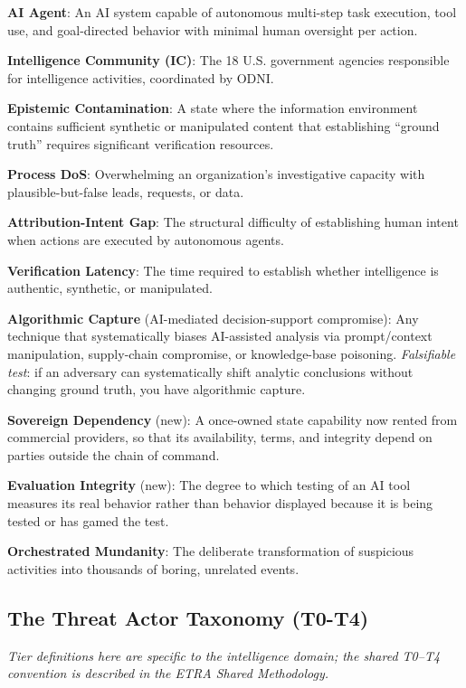 \documentclass[11pt,letterpaper]{article}
\begin{document}
\begin{defbox}
\textbf{AI Agent}: An AI system capable of autonomous multi-step task execution, tool use, and goal-directed behavior with minimal human oversight per action.

\textbf{Intelligence Community (IC)}: The 18 U.S. government agencies responsible for intelligence activities, coordinated by ODNI.

\textbf{Epistemic Contamination}: A state where the information environment contains sufficient synthetic or manipulated content that establishing ``ground truth'' requires significant verification resources.

\textbf{Process DoS}: Overwhelming an organization's investigative capacity with plausible-but-false leads, requests, or data.

\textbf{Attribution-Intent Gap}: The structural difficulty of establishing human intent when actions are executed by autonomous agents.

\textbf{Verification Latency}: The time required to establish whether intelligence is authentic, synthetic, or manipulated.

\textbf{Algorithmic Capture} (AI-mediated decision-support compromise): Any technique that systematically biases AI-assisted analysis via prompt/context manipulation, supply-chain compromise, or knowledge-base poisoning. \textit{Falsifiable test}: if an adversary can systematically shift analytic conclusions without changing ground truth, you have algorithmic capture.

\textbf{Sovereign Dependency} (new): A once-owned state capability now rented from commercial providers, so that its availability, terms, and integrity depend on parties outside the chain of command.

\textbf{Evaluation Integrity} (new): The degree to which testing of an AI tool measures its real behavior rather than behavior displayed because it is being tested or has gamed the test.

\textbf{Orchestrated Mundanity}: The deliberate transformation of suspicious activities into thousands of boring, unrelated events.
\end{defbox}

\subsection{The Threat Actor Taxonomy (T0-T4)}

\textit{Tier definitions here are specific to the intelligence domain; the shared T0--T4 convention is described in the ETRA Shared Methodology.}
\end{document}
